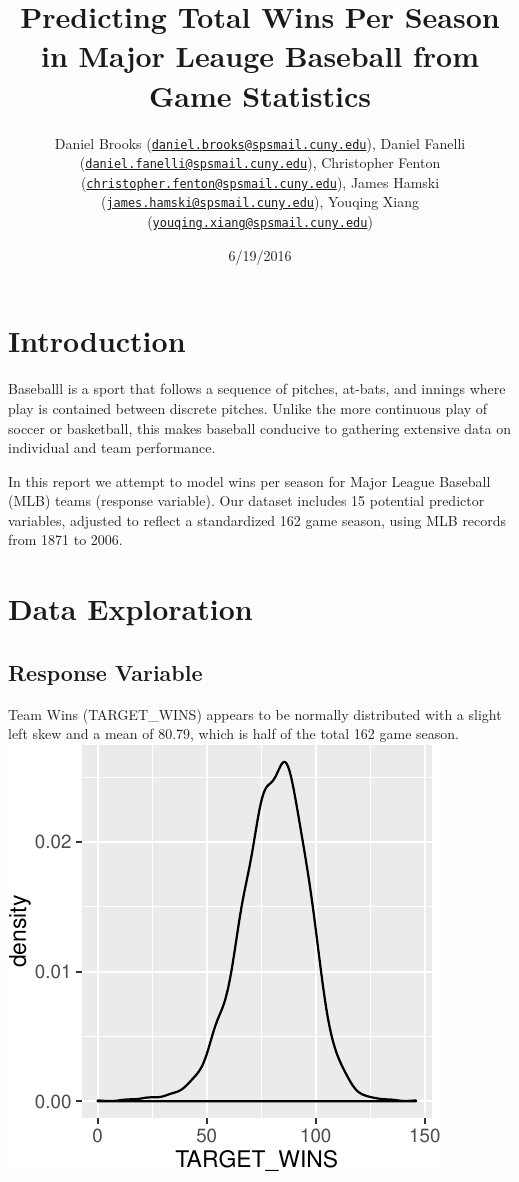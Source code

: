 \documentclass[]{article}
\title{Predicting Total Wins Per Season in Major Leauge Baseball from Game
Statistics}
\author{Daniel Brooks
(\href{mailto:daniel.brooks@spsmail.cuny.edu}{\nolinkurl{daniel.brooks@spsmail.cuny.edu}}),
Daniel Fanelli
(\href{mailto:daniel.fanelli@spsmail.cuny.edu}{\nolinkurl{daniel.fanelli@spsmail.cuny.edu}}),
Christopher Fenton
(\href{mailto:christopher.fenton@spsmail.cuny.edu}{\nolinkurl{christopher.fenton@spsmail.cuny.edu}}),
James Hamski
(\href{mailto:james.hamski@spsmail.cuny.edu}{\nolinkurl{james.hamski@spsmail.cuny.edu}}),
Youqing Xiang
(\href{mailto:youqing.xiang@spsmail.cuny.edu}{\nolinkurl{youqing.xiang@spsmail.cuny.edu}})}
\date{6/19/2016}
\begin{document}
\maketitle

\section{Introduction}\label{introduction}

Baseballl is a sport that follows a sequence of pitches, at-bats, and
innings where play is contained between discrete pitches. Unlike the
more continuous play of soccer or basketball, this makes baseball
conducive to gathering extensive data on individual and team
performance.

In this report we attempt to model wins per season for Major League
Baseball (MLB) teams (response variable). Our dataset includes 15
potential predictor variables, adjusted to reflect a standardized 162
game season, using MLB records from 1871 to 2006.

\section{Data Exploration}\label{data-exploration}

\subsection{Response Variable}\label{response-variable}

Team Wins (TARGET\_WINS) appears to be normally distributed with a
slight left skew and a mean of 80.79, which is half of the total 162
game season.\\
\includegraphics{DATA621-Homework-1_files/figure-latex/unnamed-chunk-3-1.pdf}
\end{document}
